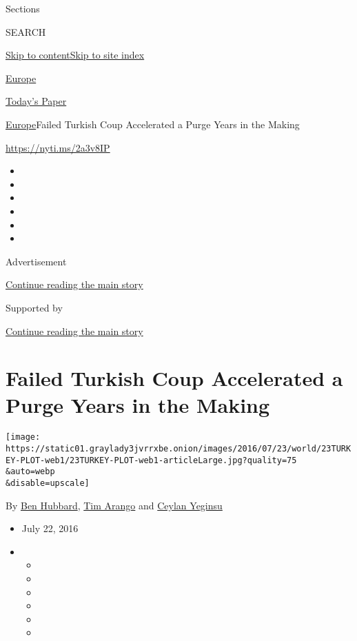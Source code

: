Sections

SEARCH

\protect\hyperlink{site-content}{Skip to
content}\protect\hyperlink{site-index}{Skip to site index}

\href{https://www.nytimes3xbfgragh.onion/section/world/europe}{Europe}

\href{https://myaccount.nytimes3xbfgragh.onion/auth/login?response_type=cookie\&client_id=vi}{}

\href{https://www.nytimes3xbfgragh.onion/section/todayspaper}{Today's
Paper}

\href{/section/world/europe}{Europe}\textbar{}Failed Turkish Coup
Accelerated a Purge Years in the Making

\url{https://nyti.ms/2a3v8IP}

\begin{itemize}
\item
\item
\item
\item
\item
\item
\end{itemize}

Advertisement

\protect\hyperlink{after-top}{Continue reading the main story}

Supported by

\protect\hyperlink{after-sponsor}{Continue reading the main story}

\hypertarget{failed-turkish-coup-accelerated-a-purge-years-in-the-making}{%
\section{Failed Turkish Coup Accelerated a Purge Years in the
Making}\label{failed-turkish-coup-accelerated-a-purge-years-in-the-making}}

\texttt{[image: https://static01.graylady3jvrrxbe.onion/images/2016/07/23/world/23TURKEY-PLOT-web1/23TURKEY-PLOT-web1-articleLarge.jpg?quality=75\\\&auto=webp\\\&disable=upscale]}

By \href{http://www.nytimes3xbfgragh.onion/by/ben-hubbard}{Ben Hubbard},
\href{http://www.nytimes3xbfgragh.onion/by/tim-arango}{Tim Arango} and
\href{http://www.nytimes3xbfgragh.onion/by/ceylan-yeginsu}{Ceylan
Yeginsu}

\begin{itemize}
\item
  July 22, 2016
\item
  \begin{itemize}
  \item
  \item
  \item
  \item
  \item
  \item
  \end{itemize}
\end{itemize}

